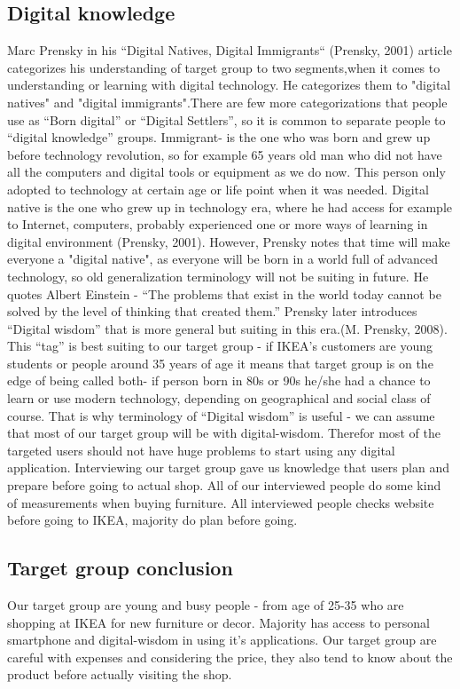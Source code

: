 \subsection{Digital knowledge}
Marc Prensky in his “Digital Natives, Digital Immigrants“ (Prensky, 2001) article categorizes his understanding of target group to two segments,when it comes to understanding or learning with digital technology. He categorizes them to "digital natives" and "digital immigrants".There are few more categorizations that people use as “Born digital” or “Digital Settlers”, so it is common to separate people to “digital knowledge” groups.  Immigrant- is the one who was born and grew up before technology revolution, so for example 65 years old man who did not have all the computers and digital tools or equipment as we do now. This person only adopted to technology at certain age or life point when it was needed. Digital native is the one who grew up in technology era, where he had access for example to Internet, computers, probably experienced one or more ways of learning in digital environment (Prensky, 2001). However, Prensky notes that time will make everyone a "digital native", as everyone will be born in a world full of advanced technology, so old generalization terminology will not be suiting in future. He quotes Albert Einstein - “The problems that exist in the world today cannot be solved by the level of thinking that created them.” Prensky later introduces “Digital wisdom” that is more general but suiting in this era.(M. Prensky, 2008). This “tag” is best suiting to our target group - if IKEA’s customers are young students or people around 35 years of age it means that target group is on the edge of being called both- if person born in 80s or 90s he/she had a chance to learn or use modern technology, depending on geographical and social class of course. That is why terminology of “Digital wisdom” is useful - we can assume that most of our target group will be with digital-wisdom. Therefor most of the targeted users should not have huge problems to start using any digital application.
Interviewing our target group gave us knowledge that users plan and prepare before going to actual shop. All of our interviewed people do some kind of measurements when buying furniture. All interviewed people checks website before going to IKEA, majority do plan before going. 
\subsection{Target group conclusion}
Our target group are young and busy people - from age of 25-35 who are shopping at IKEA for new furniture or decor. Majority has access to personal smartphone and digital-wisdom in using it’s applications. Our target group are careful with expenses and considering the price, they also tend to know about the product before actually visiting the shop. 


